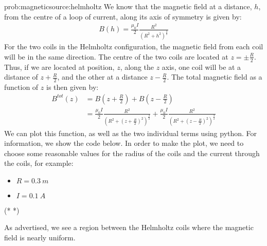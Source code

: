 \begin{solution}{prob:magneticsource:helmholtz}\label{soln:magneticsource:helmholtz}
We know that the magnetic field at a distance, $h$, from the centre of a loop of current, along its axis of symmetry is given by:
\begin{align*}
 B(h) = \frac{\mu_0 I}{2}\frac{R^2}{(R^2+h^2)^{\frac{3}{2}}}
\end{align*}
For the two coils in the Helmholtz configuration, the magnetic field from each coil will be in the same direction. The centre of the two coils are located at $z=\pm\frac{R}{2}$. Thus, if we are located at position, $z$, along the $z$ axis, one coil will be at a distance of $z+\frac{R}{2}$, and the other at a distance $z-\frac{R}{2}$. The total magnetic field as a function of $z$ is then given by:
\begin{align*}
B^{tot}(z) &= B\left(z+\frac{R}{2}\right)+B\left(z-\frac{R}{2}\right)\\
&=\frac{\mu_0 I}{2}\frac{R^2}{(R^2+\left(z+\frac{R}{2}\right)^2)^{\frac{3}{2}}}+\frac{\mu_0 I}{2}\frac{R^2}{(R^2+\left(z-\frac{R}{2}\right)^2)^{\frac{3}{2}}}
\end{align*}
We can plot this function, as well as the two individual terms using python. For information, we show the code below. In order to make the plot, we need to choose some reasonable values for the radius of the coils and the current through the coils, for example:
\begin{itemize}
\item $R=\SI{0.3}{m}$
\item $I=\SI{0.1}{A}$
\end{itemize}
	
\begin{poutput}
	(*  *)
\end{poutput}
As advertised, we see a region between the Helmholtz coils where the magnetic field is nearly uniform. 
\end{solution}
